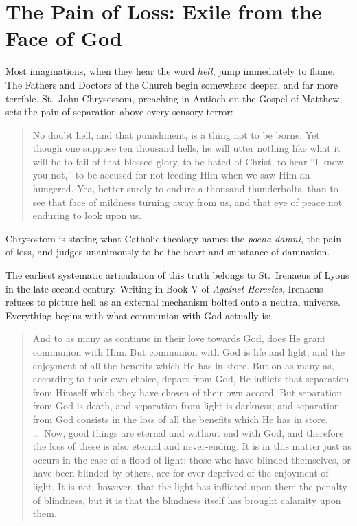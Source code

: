 \section{The Pain of Loss: Exile from the Face of God}

Most imaginations, when they hear the word \textit{hell}, jump immediately to flame. The Fathers and Doctors of the Church begin somewhere deeper, and far more terrible. St.\ John Chrysostom, preaching in Antioch on the Gospel of Matthew, sets the pain of separation above every sensory terror:

\begin{quote}
No doubt hell, and that punishment, is a thing not to be borne. Yet though one suppose ten thousand hells, he will utter nothing like what it will be to fail of that blessed glory, to be hated of Christ, to hear ``I know you not,'' to be accused for not feeding Him when we saw Him an hungered. Yea, better surely to endure a thousand thunderbolts, than to see that face of mildness turning away from us, and that eye of peace not enduring to look upon us.
\end{quote}

Chrysostom is stating what Catholic theology names the \textit{poena damni}, the pain of loss, and judges unanimously to be the heart and substance of damnation.

The earliest systematic articulation of this truth belongs to St.\ Irenaeus of Lyons in the late second century. Writing in Book V of \textit{Against Heresies}, Irenaeus refuses to picture hell as an external mechanism bolted onto a neutral universe. Everything begins with what communion with God actually is:

\begin{quote}
And to as many as continue in their love towards God, does He grant communion with Him. But communion with God is life and light, and the enjoyment of all the benefits which He has in store. But on as many as, according to their own choice, depart from God, He inflicts that separation from Himself which they have chosen of their own accord. But separation from God is death, and separation from light is darkness; and separation from God consists in the loss of all the benefits which He has in store. \dots\ Now, good things are eternal and without end with God, and therefore the loss of these is also eternal and never-ending. It is in this matter just as occurs in the case of a flood of light: those who have blinded themselves, or have been blinded by others, are for ever deprived of the enjoyment of light. It is not, however, that the light has inflicted upon them the penalty of blindness, but it is that the blindness itself has brought calamity upon them.
\end{quote}

